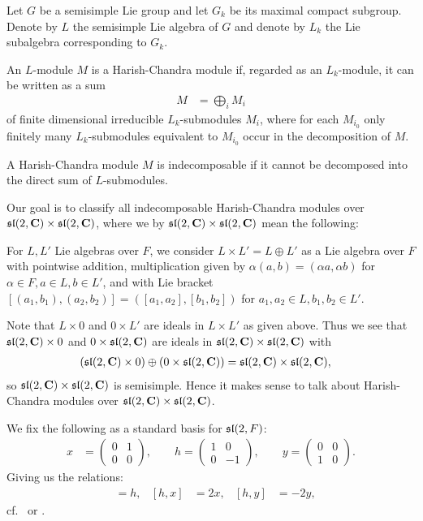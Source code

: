 Let $G$ be a semisimple Lie group and let $G_k$ be its maximal compact subgroup. Denote by $L$ the semisimple Lie algebra of $G$ and denote by $L_k$ the Lie subalgebra corresponding to $G_k$.

\begin{definition}
  An $L$-module $M$ is a Harish-Chandra module if, regarded as an $L_k$-module, it can be written as a sum
  \begin{align*}
    M &= \bigoplus_{i} M_i
  \end{align*}
  of finite dimensional irreducible $L_k$-submodules $M_i$, where for each $M_{i_0}$ only finitely many $L_k$-submodules equivalent to $M_{i_0}$ occur in the decomposition of $M$.

  A Harish-Chandra module $M$ is indecomposable if it cannot be decomposed into the direct sum of $L$-submodules.
\end{definition}

Our goal is to classify all indecomposable Harish-Chandra modules over $\mathfrak{sl}(2,\mathbf{C})\times \mathfrak{sl}(2,\mathbf{C})$, where we by $\mathfrak{sl}(2,\mathbf{C})\times \mathfrak{sl}(2,\mathbf{C})$ mean the following:

For $L,L'$ Lie algebras over $F$, we consider $L\times L'=L\oplus L'$ as a Lie algebra over $F$ with pointwise addition, multiplication given by $\alpha(a,b)=(\alpha a,\alpha b)$ for $\alpha\in F,a\in L,b\in L'$, and with Lie bracket $[(a_1,b_1),(a_2,b_2)]=([a_1,a_2],[b_1,b_2])$ for $a_1,a_2\in L,b_1,b_2\in L'$.

\begin{remark}
  Note that $L\times 0$ and $0\times L'$ are ideals in $L\times L'$ as given above. Thus we see that $\mathfrak{sl}(2,\mathbf{C})\times 0$ and $0\times \mathfrak{sl}(2,\mathbf{C})$ are ideals in $\mathfrak{sl}(2,\mathbf{C})\times \mathfrak{sl}(2,\mathbf{C})$ with
  \begin{align*}
    (\mathfrak{sl}(2,\mathbf{C})\times 0) \oplus (0\times\mathfrak{sl}(2,\mathbf{C})) &= \mathfrak{sl}(2,\mathbf{C})\times \mathfrak{sl}(2,\mathbf{C}),
  \end{align*}
  so $\mathfrak{sl}(2,\mathbf{C})\times \mathfrak{sl}(2,\mathbf{C})$ is semisimple. Hence it makes sense to talk about Harish-Chandra modules over $\mathfrak{sl}(2,\mathbf{C})\times \mathfrak{sl}(2,\mathbf{C})$.
\end{remark}

We fix the following as a standard basis for $\mathfrak{sl}(2,F)$:
\begin{align*}
  x&=
     \begin{pmatrix}
       0 & 1 \\ 0 & 0
     \end{pmatrix}, \qquad h =
                    \begin{pmatrix}
                      1 & 0 \\ 0 & -1
                    \end{pmatrix}, \qquad y =
                                   \begin{pmatrix}
                                     0 & 0 \\ 1 & 0
                                   \end{pmatrix}.
\end{align*}
Giving us the relations:
\begin{align}
  [x,y]&=h, & [h,x]&=2x, & [h,y]&=-2y, \label{eq:sl2rels}
\end{align}
cf.\ \cite[35]{jantzen} or \cite[6]{humphrey}.

